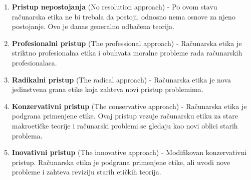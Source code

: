 \documentclass[a4paper]{article}
\begin{document}
\begin{enumerate}
	\item \textbf{Pristup nepostojanja} (No resolution approach) - Po ovom stavu računarska etika ne bi trebala da postoji, odnosno nema osnove za njeno postojanje. Ovo je danas generalno odbačena teorija.
	\item \textbf{Profesionalni pristup} (The professional approach) - Računarska etika je striktno profesionalna etika i obuhvata moralne probleme rada računarskih profesionalaca.
	\item \textbf{Radikalni pristup} (The radical approach) - Računarska etika je nova jedinstvena grana etike koja zahteva novi pristup problemima.
	\item \textbf{Konzervativni pristup} (The conservative approach) - Računarska etika je podgrana primenjene etike. Ovaj pristup vezuje računarsku etiku za stare makroetičke teorije i računarski problemi se gledaju kao novi oblici starih problema.
	\item \textbf{Inovativni pristup} (The innovative approach) - Modifikovan konzervativni pristup. Računarska etika je podgrana primenjene etike, ali uvodi nove probleme i zahteva reviziju starih etičkih teorija.
\end{enumerate}





\end{document}
